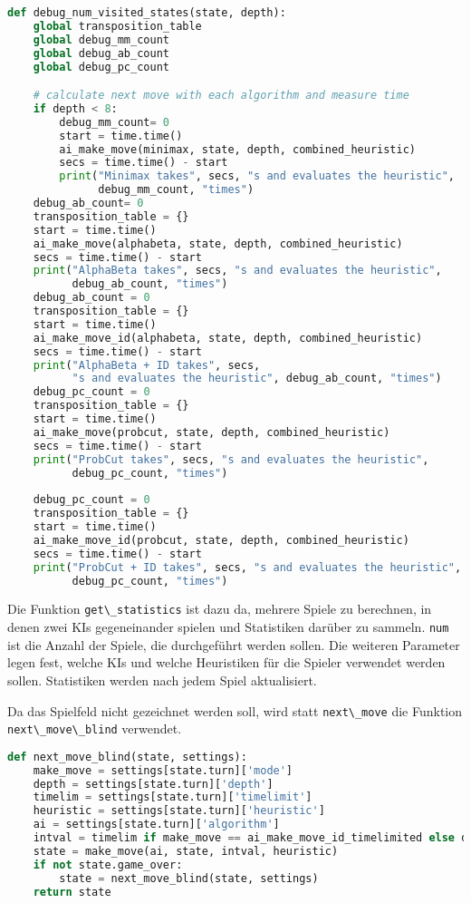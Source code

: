 \begin{lstlisting}[language=Python]
def debug_num_visited_states(state, depth):
    global transposition_table
    global debug_mm_count
    global debug_ab_count
    global debug_pc_count

    # calculate next move with each algorithm and measure time
    if depth < 8:
        debug_mm_count= 0
        start = time.time()
        ai_make_move(minimax, state, depth, combined_heuristic)
        secs = time.time() - start
        print("Minimax takes", secs, "s and evaluates the heuristic",
              debug_mm_count, "times")
    debug_ab_count= 0
    transposition_table = {}
    start = time.time()
    ai_make_move(alphabeta, state, depth, combined_heuristic)
    secs = time.time() - start
    print("AlphaBeta takes", secs, "s and evaluates the heuristic",
          debug_ab_count, "times")
    debug_ab_count = 0
    transposition_table = {}
    start = time.time()
    ai_make_move_id(alphabeta, state, depth, combined_heuristic)
    secs = time.time() - start
    print("AlphaBeta + ID takes", secs,
          "s and evaluates the heuristic", debug_ab_count, "times")
    debug_pc_count = 0
    transposition_table = {}
    start = time.time()
    ai_make_move(probcut, state, depth, combined_heuristic)
    secs = time.time() - start
    print("ProbCut takes", secs, "s and evaluates the heuristic",
          debug_pc_count, "times")
    
    debug_pc_count = 0
    transposition_table = {}
    start = time.time()
    ai_make_move_id(probcut, state, depth, combined_heuristic)
    secs = time.time() - start
    print("ProbCut + ID takes", secs, "s and evaluates the heuristic",
          debug_pc_count, "times")
\end{lstlisting}

Die Funktion \passthrough{\lstinline!get\_statistics!} ist dazu da,
mehrere Spiele zu berechnen, in denen zwei \acp{KI} gegeneinander
spielen und Statistiken darüber zu sammeln.
\passthrough{\lstinline!num!} ist die Anzahl der Spiele, die
durchgeführt werden sollen. Die weiteren Parameter legen fest, welche
\acp{KI} und welche Heuristiken für die Spieler verwendet werden sollen.
Statistiken werden nach jedem Spiel aktualisiert.

Da das Spielfeld nicht gezeichnet werden soll, wird statt
\passthrough{\lstinline!next\_move!} die Funktion
\passthrough{\lstinline!next\_move\_blind!} verwendet.

\begin{lstlisting}[language=Python]
def next_move_blind(state, settings):
    make_move = settings[state.turn]['mode']
    depth = settings[state.turn]['depth']
    timelim = settings[state.turn]['timelimit']
    heuristic = settings[state.turn]['heuristic']
    ai = settings[state.turn]['algorithm']
    intval = timelim if make_move == ai_make_move_id_timelimited else depth
    state = make_move(ai, state, intval, heuristic)
    if not state.game_over:
        state = next_move_blind(state, settings)
    return state
\end{lstlisting}

